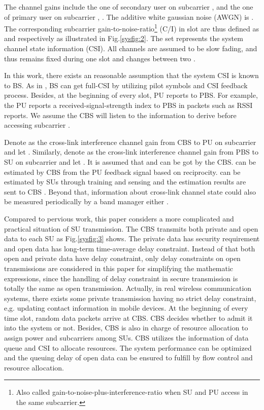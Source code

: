 \documentclass[journal]{IEEEtran}
\begin{document}
The channel gains include the one of secondary user  on subcarrier ,  and the one of
primary user  on subcarrier , . The additive white gaussian noise (AWGN) is . The
corresponding subcarrier gain-to-noise-ratio\footnote[1]{Also called gain-to-noise-plus-interference-ratio when SU and PU access in the same subcarrier.} (C/I) in slot  are thus
defined as  and  respectively as  illustrated in Fig.\ref{sysfig:2}.  The set
 represents the system channel state information (CSI). All channels are assumed to be slow fading, and thus
  remains fixed during one slot and changes between two \cite{tse2005fundamentals}. { In this work, there exists an reasonable assumption that the system CSI is known to BS. As in \cite{wallace2002method}, BS can get  full-CSI by utilizing pilot symbols and CSI feedback process.  Besides,  at the beginning of every slot, PU reports
  to PBS. For example, the PU reports a received-signal-strength index to PBS in packets such as RSSI
 reports. We assume the CBS will listen to the information to derive  before accessing subcarrier  { \cite{lapiccirella2013distributed,wallace2002method}}.

  Denote  as  the cross-link interference channel gain from CBS to PU  on subcarrier  and let . Similarly, denote  as  the cross-link interference channel gain from PBS to SU  on subcarrier  and let .  It is assumed that  and  can be got by the CBS.  can be estimated
 by CBS from the PU feedback signal based on reciprocity.  can be estimated by SUs through training
 and sensing and the estimation results are sent to CBS \cite{wallace2002method}.  Beyond that, information about cross-link channel state could also be measured periodically by a band manager either \cite{suraweera2010capacity,almalfouh2011interference}.}

Compared to pervious work, this paper considers a more complicated and  practical situation of SU transmission.  The CBS
transmits both private and open data to each SU as Fig.\ref{sysfig:3} shows. The private data has security requirement and open data has long-term time-average delay constraint. Instead of that both open and private data have delay constraint, only delay constraints on open transmissions are considered in this paper for simplifying the mathematic expressions, since the handling of delay constraint in secure transmission is totally the same as open transmission. Actually, in real wireless communication systems, there exists some private transmission having no strict delay constraint, e,g. updating  contact information in mobile devices. At the beginning of every time slot, random data packets arrive at CBS. CBS  decides whether to admit it into the system or not. Besides, CBS is also in charge of resource allocation to assign  power and subcarriers among SUs. CBS utilizes the information of data queue and CSI to allocate resources. The system performance can be optimized and the queuing delay of open data can be ensured to fulfill by flow control and resource allocation.
\end{document}
